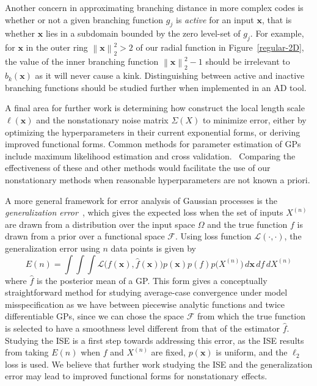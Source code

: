 \documentclass{article}
\newcommand{\norm}[1]{\left\lVert#1\right\rVert}
\renewcommand{\vec}[1]{\mathbf{#1}}
\numberwithin{equation}{section}
\begin{document}
Another concern in approximating branching distance in more complex codes is whether or not a given branching function $g_j$ is \textit{active} for an input $\vec{x}$, that is whether $\vec{x}$ lies in a subdomain bounded by the zero level-set of $g_j$. For example, for $\vec{x}$ in the outer ring $\norm{\vec{x}}_2^2 > 2$ of our radial function in Figure~\ref{regular-2D}, the value of the inner branching function $\norm{\vec{x}}_2^2 - 1$ should be irrelevant to $\hat{b}_k(\vec{x})$
as it will never cause a kink. Distinguishing between active and inactive branching functions should be studied further when implemented in an AD tool.

A final area for further work is determining how construct the local length scale $\ell(\vec{x})$ and the nonstationary noise matrix $\Sigma(X)$ to minimize error, either by optimizing the hyperparameters in their current exponential forms, or deriving improved functional forms. Common methods for parameter estimation of GPs include maximum likelihood estimation and cross validation.~\cite{rasmussen2003gaussian} Comparing the effectiveness of these and other methods would facilitate the use of our nonstationary methods when reasonable hyperparameters are not known a priori.

A more general framework for error analysis of Gaussian processes is the \textit{generalization error}~\cite{rasmussen2003gaussian, sollich1999learning}, which gives the expected loss when the set of inputs $X^{(n)}$ are drawn from a distribution over the input space $\Omega$ and the true function $f$ is drawn from a prior over a functional space $\mathcal{F}$. Using loss function $\mathcal{L}(\cdot, \cdot)$, the generalization error using $n$ data points is given by
$$ E(n) = \int \int \int \mathcal{L}\Big(f(\vec{x}), \hat{f}(\vec{x})\Big) p(\vec{x}) p(f) p\big(X^{(n)}\big) \, d\vec{x} \, df \,  dX^{(n)}$$
where $\hat{f}$ is the posterior mean of a GP. This form gives a conceptually straightforward method for studying average-case convergence under model misspecification as we have between piecewise analytic functions and twice differentiable GPs, since we can chose the space $\mathcal{F}$ from which the true function is selected to have a smoothness level different from that of the estimator $\hat{f}$. Studying the ISE is a first step towards addressing this error, as the ISE results from taking $E(n)$ when $f$ and $X^{(n)}$ are fixed, $p(\vec{x})$ is uniform, and the $\ell_2$ loss is used. We believe that further work studying the ISE and the generalization error may lead to improved functional forms for nonstationary effects.

\newpage

{}

\end{document}
